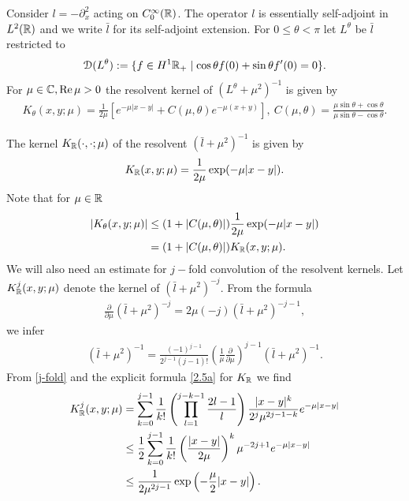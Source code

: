 Consider $l=-\partial_x^2$ acting on $C^\infty_0(\mathbb{R})$.
The operator $l$ is essentially self-adjoint in $L^2(\mathbb{R})$ and we write $\bar{l}$ for its self-adjoint extension.
For $0 \leq \theta <\pi$ let $L^\theta$ be $\bar{l}$ restricted to 
\begin{align}
\operatorname{\mathcal{D}} (L^\theta) := 
\{f \in H^1\mathbb{R}_+ \mid \cos \theta f(0) + \sin \theta f'(0) =0\}.
\end{align}
For $\mu \in \mathbb{C}, \textup{Re}\, \mu >0$ the resolvent kernel 
of $(L^\theta + \mu^2)^{-1}$ is given by 
\begin{align}\label{kernel-theta}
 K_\theta (x,y;\mu) = \frac{1}{2\mu} 
\left[e^{-\mu |x-y|} + C(\mu,\theta) e^{-\mu (x+y)}\right], \
C(\mu,\theta) = \frac{\mu \sin \theta + \cos \theta}
{ \mu \sin \theta - \cos \theta}.
\end{align}

The kernel $K_{\mathbb{R}}(\cdot, \cdot ;\mu)$ of the resolvent $(\bar{l}+\mu^2)^{-1}$ is given by
\begin{align}\label{2.5a}
K_{\mathbb{R}}(x,y;\mu) = \frac{1}{2\mu} \exp(-\mu |x-y|).
\end{align}
Note that for $\mu\in\mathbb{R}$
\begin{equation}
 \begin{split}
  \label{kernel-theta-est}
 |K_\theta (x,y;\mu)| &\leq (1+|C(\mu,\theta)|) \frac{1}{2\mu} \exp(-\mu |x-y|) \\ 
&=  (1+|C(\mu,\theta)|) K_{\mathbb{R}}(x,y;\mu).
 \end{split}
\end{equation}
We will also need an estimate for $j-$fold convolution of the 
resolvent kernels. Let $K_{\mathbb{R}}^j(x,y;\mu)$ denote the kernel of $(\bar{l}+\mu^2)^{-j}$. 
From the formula
\begin{align}
\frac{\partial}{\partial \mu} (\bar{l}+\mu^2)^{-j} = 2\mu(-j) (\bar{l}+\mu^2)^{-j-1},
\end{align}
we infer 
\begin{align}\label{j-fold}
(\bar{l}+\mu^2)^{-1} = \frac{(-1)^{j-1}}{2^{j-1} (j-1)!}\left(\frac{1}{\mu}
\frac{\partial}{\partial \mu}\right)^{j-1} (\bar{l}+\mu^2)^{-1}. 
\end{align}
From \eqref{j-fold} and the explicit formula \eqref{2.5a} for $K_{\mathbb{R}}$ we find
\begin{equation}
 \begin{split}
\label{kernel-real}
 K_{\mathbb{R}}^j(x,y;\mu) &= \sum_{k=0}^{j-1} \frac{1}{k!} \left(\prod\limits_{l=1}^{j-k-1} \frac{2l-1}{l} \right)
\frac{|x-y|^k}{2^j \mu^{2j-1-k}}e^{-\mu|x-y|}\\ & \leq \frac{1}{2} \sum_{k=0}^{j-1} 
\frac{1}{k!} \left( \frac{|x-y|}{2\mu}\right)^k \mu^{-2j+1} e^{-\mu|x-y|} \\
&\leq \frac{1}{2\mu^{2j-1}}\exp\left (-\frac{\mu}{2}|x-y|\right).
 \end{split}
\end{equation}

